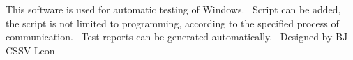 This software is used for automatic testing of Windows.~\newline
 Script can be added, the script is not limited to programming, according to the specified process of communication.~\newline
 Test reports can be generated automatically.~\newline
 Designed by BJ C\+S\+SV Leon  